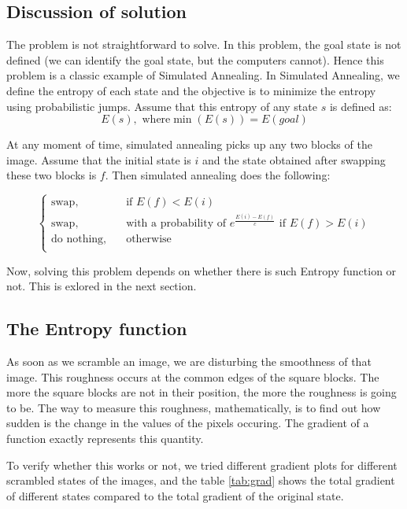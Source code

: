 \documentclass[journal, compsoc]{IEEEtran}
\begin{document}
\subsection{Discussion of solution}

The problem is not straightforward to solve. In this problem, the goal state is not defined (we can identify the goal state, but the
computers cannot). Hence this problem is a classic example of Simulated Annealing. In Simulated Annealing, we define the entropy of each
state and the objective is to minimize the entropy using probabilistic jumps. Assume that this entropy of any state $s$ is defined as:
\[
    E(s), \text{ where} \min{(E(s))} = E(goal)
\]

At any moment of time, simulated annealing picks up any two blocks of the image. Assume that the initial state is $i$ and the state
obtained after swapping these two blocks is $f$. Then simulated annealing does the following:

\[
     \begin{cases}
       \text{swap,} &\quad\text{if } E(f) < E(i)\\
       \text{swap,} &\quad\text{with a probability of } e^{\frac{E(i) - E(f)}{c}} \text{ if } E(f) > E(i)\\
       \text{do nothing,} &\quad\text{otherwise}\\
     \end{cases}
\]

Now, solving this problem depends on whether there is such Entropy function or not. This is exlored in the next section.

\subsection{The Entropy function}

As soon as we scramble an image, we are disturbing the smoothness of that image. This roughness occurs at the common edges of the square
blocks. The more the square blocks are not in their position, the more the roughness is going to be. The way to measure this roughness,
mathematically, is to find out how sudden is the change in the values of the pixels occuring. The gradient of a function exactly represents this
quantity.

To verify whether this works or not, we tried different gradient plots for different scrambled states of the images, and the table \ref{tab:grad}
shows the total gradient of different states compared to the total gradient of the original state.
\end{document}
